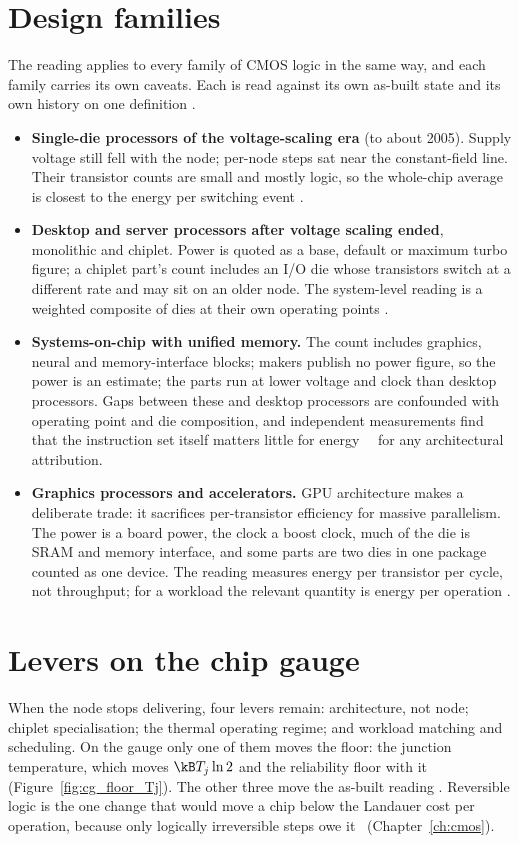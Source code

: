 \section{Design families}\label{sec:cg_families}
The reading applies to every family of CMOS logic in the same way, and each family carries its own caveats. Each is read against its own
as-built state and its own history on one definition \interp.
\begin{itemize}
\item \textbf{Single-die processors of the voltage-scaling era} (to about 2005). Supply voltage still fell with the node; per-node steps sat
near the constant-field line. Their transistor counts are small and mostly logic, so the whole-chip average is closest to the energy per
switching event \interp.
\item \textbf{Desktop and server processors after voltage scaling ended}, monolithic and chiplet. Power is quoted as a base, default or
maximum turbo figure; a chiplet part's count includes an I/O die whose transistors switch at a different rate and may sit on an older node.
The system-level reading is a weighted composite of dies at their own operating points \interp.
\item \textbf{Systems-on-chip with unified memory.} The count includes graphics, neural and memory-interface blocks; makers publish no power
figure, so the power is an estimate; the parts run at lower voltage and clock than desktop processors. Gaps between these and desktop
processors are confounded with operating point and die composition, and independent measurements find that the instruction set itself matters
little for energy~\cite{Blem2013} \conjecture\ for any architectural attribution.
\item \textbf{Graphics processors and accelerators.} GPU architecture makes a deliberate trade: it sacrifices per-transistor efficiency for
massive parallelism. The power is a board power, the clock a boost clock, much of the die is SRAM and memory interface, and some parts are two
dies in one package counted as one device. The reading measures energy per transistor per cycle, not throughput; for a workload the relevant
quantity is energy per operation \interp.
\end{itemize}

\section{Levers on the chip gauge}\label{sec:cg_levers}
When the node stops delivering, four levers remain: architecture, not node; chiplet specialisation; the thermal operating regime; and
workload matching and scheduling. On the gauge only one of them moves the floor: the junction temperature, which moves $\kB T_j\ln2$ and the
reliability floor with it (Figure~\ref{fig:cg_floor_Tj}). The other three move the as-built reading \interp. Reversible logic is the one change
that would move a chip below the Landauer cost per operation, because only logically irreversible steps owe it~\cite{Bennett1973}
(Chapter~\ref{ch:cmos}).

